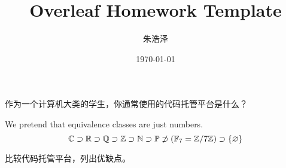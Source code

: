 \documentclass{homework}
\author{朱浩泽}
\date{\today}
\title{Overleaf Homework Template}
\begin{document}
 \maketitle

\question 作为一个计算机大类的学生，你通常使用的代码托管平台是什么？

We pretend that equivalence classes are just numbers.
\[
	\C \supset \R \supset \Q \supset \Z \supset \N \supset
	\P \not\supset (\GF[7] = \modulo[7])  \supset \{\nil\}
\]

\question 比较代码托管平台，列出优缺点。





\question 
\end{document}
